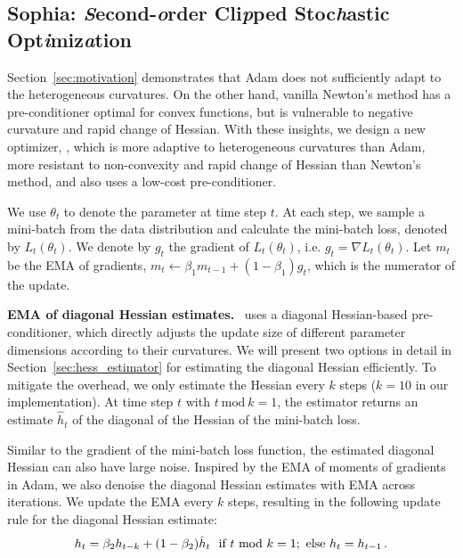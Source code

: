 \subsection{Sophia: \textit{S}econd-\textit{o}rder Cli\textit{p}ped Stoc\textit{h}astic Opt\textit{i}miz\textit{a}tion}\label{sec:sophia}


Section~\ref{sec:motivation} demonstrates that Adam does not sufficiently adapt to the heterogeneous curvatures. On the other hand, vanilla Newton’s method has a pre-conditioner optimal for convex functions, but is vulnerable to negative curvature and rapid change of Hessian. With these insights, we design a new optimizer, \ours, which is more adaptive to heterogeneous curvatures than Adam, more resistant to non-convexity and rapid change of Hessian than Newton's method, and also uses a low-cost pre-conditioner. 



We use $\theta_t$ to denote the parameter at time step $t$. At each step, we sample a mini-batch from the data distribution and calculate the mini-batch loss, denoted by $L_t(\theta_t)$. We denote by $g_t$ the gradient of $L_t(\theta_t)$, i.e. $g_t = \nabla L_t(\theta_t)$. Let $m_t$ be the EMA of gradients, $m_{t} \leftarrow \beta_{1} m_{t-1} + (1 - \beta_{1}) g_{t}$, which is the numerator of the update. 

\textbf{EMA of diagonal Hessian estimates.} \ours~uses a diagonal Hessian-based pre-conditioner, which directly adjusts the update size of different parameter dimensions according to their curvatures. We will present two options in detail in Section~\ref{sec:hess_estimator} for estimating the diagonal Hessian efficiently. 
To mitigate the overhead, we only estimate the Hessian every $k$ steps ($k=10$ in our implementation). At time step $t$ with $t \ \mathrm{mod} \ k = 1$, the estimator returns an estimate $\hat h_t$ of the diagonal of the Hessian of the mini-batch loss. 

Similar to the gradient of the mini-batch loss function, the estimated diagonal Hessian can also have large noise. Inspired by the EMA of moments of gradients in Adam, we also denoise the diagonal Hessian estimates with EMA across iterations. We update the EMA every $k$ steps, resulting in the following update rule for the diagonal Hessian estimate:
\begin{align}
h_t = \beta_2 h_{t-k} + (1 - \beta_2) \hat{h}_{t} \ \textup{ if } t \ \mathrm{mod} \ k = 1 ; \textup{ else } h_t = h_{t-1}\,.
\end{align}


